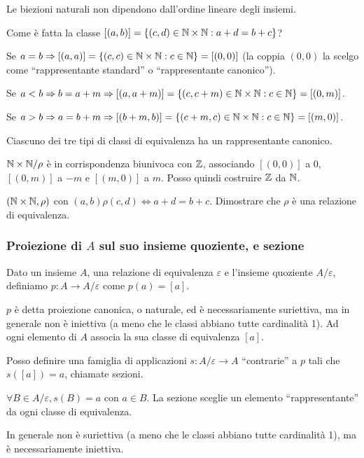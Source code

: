 \begin{defn}
Le biezioni naturali non dipendono dall'ordine lineare degli insiemi.
\end{defn}

Come \`e fatta la classe $[(a,b)] = \left \{ (c,d) \in \mathbb{N} \times \mathbb{N} : a + d = b + c \right\}$?

Se $a = b \Rightarrow [(a,a)] = \left \{ (c,c) \in \mathbb{N} \times \mathbb{N} : c \in \mathbb{N} \right\} = [(0,0)]$ (la coppia $(0,0)$ la scelgo come ``rappresentante standard'' o ``rappresentante canonico'').

Se $a < b \Rightarrow b = a + m \Rightarrow [(a,a+m)] = \left \{ (c, c + m) \in \mathbb{N} \times \mathbb{N} : c \in \mathbb{N}\right\} = [(0,m)]$.

Se $a > b \Rightarrow a = b + m \Rightarrow [(b + m, b)] = \left \{ (c + m, c) \in \mathbb{N} \times \mathbb{N} : c \in \mathbb{N}\right\} = [(m,0)]$.

Ciascuno dei tre tipi di classi di equivalenza ha un rappresentante canonico.

$\mathbb{N} \times \mathbb{N} / \rho$ \`e in corrispondenza biunivoca con $\mathbb{Z}$, associando $[(0,0)]$ a 0, $[(0,m)]$ a $-m$ e $[(m,0)]$ a $m$. Posso quindi costruire $\mathbb{Z}$ da $\mathbb{N}$.

\begin{esercizio}
$(\mathbb{N} \times \mathbb{N}, \rho)$ con $(a,b) \rho (c,d) \iff a + d = b + c$. Dimostrare che $\rho$ \`e una relazione di equivalenza.

\vspace{5cm}
\end{esercizio}

\subsubsection{Proiezione di $A$ sul suo insieme quoziente, e sezione}

\begin{defn}[Proiezione]
Dato un insieme $A$, una relazione di equivalenza $\varepsilon$ e l'insieme quoziente $A / \varepsilon$, definiamo $p : A \to A / \varepsilon $ come $ p(a) = [a]$.
\end{defn}
$p$ \`e detta proiezione canonica, o naturale, ed \`e necessariamente suriettiva, ma in generale non \`e iniettiva (a meno che le classi abbiano tutte cardinalit\`a 1). Ad ogni elemento di $A$ associa la sua classe di equivalenza $[a]$.

Posso definire una famiglia di applicazioni $s : A / \varepsilon \to A $ ``contrarie'' a $p$ tali che $s([a]) = a$, chiamate sezioni.
\begin{defn}[Sezione]
$\forall B \in A / \varepsilon , s(B) = a$ con $a \in B$. La sezione sceglie un elemento ``rappresentante'' da ogni classe di equivalenza. 
\end{defn}
In generale non \`e suriettiva (a meno che le classi abbiano tutte cardinalit\`a 1), ma \`e necessariamente iniettiva.


